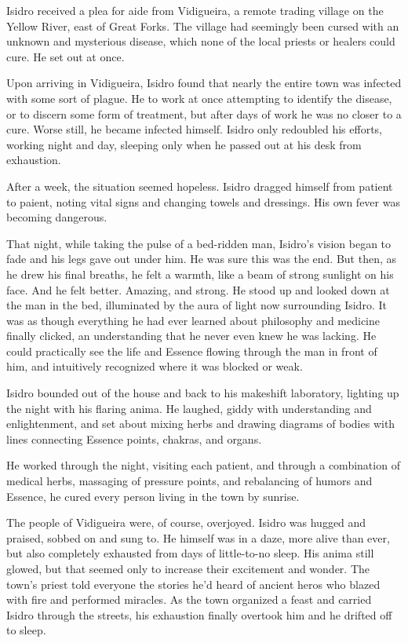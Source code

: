 Isidro received a plea for aide from Vidigueira, a remote trading village on
the Yellow River, east of Great Forks. The village had seemingly been cursed
with an unknown and mysterious disease, which none of the local priests or
healers could cure. He set out at once.

Upon arriving in Vidigueira, Isidro found that nearly the entire town was
infected with some sort of plague. He to work at once attempting to identify
the disease, or to discern some form of treatment, but after days of work he
was no closer to a cure. Worse still, he became infected himself. Isidro only
redoubled his efforts, working night and day, sleeping only when he passed out
at his desk from exhaustion.

After a week, the situation seemed hopeless. Isidro dragged himself from
patient to paient, noting vital signs and changing towels and dressings. His
own fever was becoming dangerous.

That night, while taking the pulse of a bed-ridden man, Isidro's vision began
to fade and his legs gave out under him. He was sure this was the end. But
then, as he drew his final breaths, he felt a warmth, like a beam of strong
sunlight on his face. And he felt better. Amazing, and strong. He stood up and
looked down at the man in the bed, illuminated by the aura of light now
surrounding Isidro. It was as though everything he had ever learned about
philosophy and medicine finally clicked, an understanding that he never even
knew he was lacking. He could practically see the life and Essence flowing
through the man in front of him, and intuitively recognized where it was
blocked or weak.

Isidro bounded out of the house and back to his makeshift laboratory, lighting
up the night with his flaring anima. He laughed, giddy with understanding and
enlightenment, and set about mixing herbs and drawing diagrams of bodies with
lines connecting Essence points, chakras, and organs.

He worked through the night, visiting each patient, and through a combination
of medical herbs, massaging of pressure points, and rebalancing of humors and
Essence, he cured every person living in the town by sunrise.

The people of Vidigueira were, of course, overjoyed. Isidro was hugged and
praised, sobbed on and sung to. He himself was in a daze, more alive than ever,
but also completely exhausted from days of little-to-no sleep. His anima still
glowed, but that seemed only to increase their excitement and wonder. The
town's priest told everyone the stories he'd heard of ancient heros who blazed
with fire and performed miracles. As the town organized a feast and carried
Isidro through the streets, his exhaustion finally overtook him and he drifted
off to sleep.


